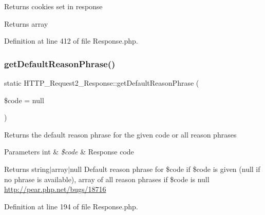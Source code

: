 Returns cookies set in response

\begin{DoxyReturn}{Returns}
array 
\end{DoxyReturn}


Definition at line 412 of file Response.\+php.

\hypertarget{classHTTP__Request2__Response_ae6a45aaf10437d67b4710d61702d9819}{}\label{classHTTP__Request2__Response_ae6a45aaf10437d67b4710d61702d9819} 
\subsubsection{\texorpdfstring{get\+Default\+Reason\+Phrase()}{getDefaultReasonPhrase()}}
{\footnotesize\ttfamily static H\+T\+T\+P\+\_\+\+Request2\+\_\+\+Response\+::get\+Default\+Reason\+Phrase (\begin{DoxyParamCaption}\item[{}]{\$code = {\ttfamily null} }\end{DoxyParamCaption})\hspace{0.3cm}{\ttfamily [static]}}

Returns the default reason phrase for the given code or all reason phrases


\begin{DoxyParams}[1]{Parameters}
int & {\em \$code} & Response code\\
\hline
\end{DoxyParams}
\begin{DoxyReturn}{Returns}
string$\vert$array$\vert$null Default reason phrase for \$code if \$code is given (null if no phrase is available), array of all reason phrases if \$code is null \hyperlink{}{http\+://pear.\+php.\+net/bugs/18716}
\end{DoxyReturn}


Definition at line 194 of file Response.\+php.

\hypertarget{classHTTP__Request2__Response_ac62d21f48b31db496403da74ec9a9635}{}\label{classHTTP__Request2__Response_ac62d21f48b31db496403da74ec9a9635} 
